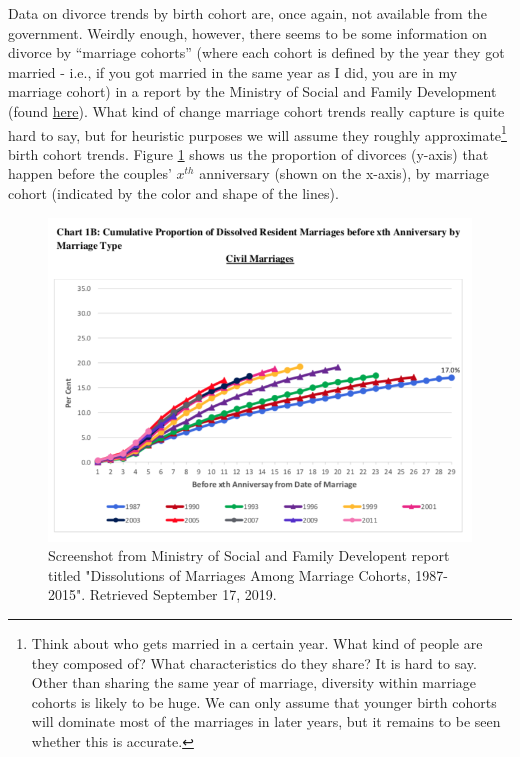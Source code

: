 \documentclass[openany]{book}
\let\rmarkdownfootnote\footnote%
\def\footnote{\protect\rmarkdownfootnote}
\begin{document}
Data on divorce trends by birth cohort are, once again, not available
from the government. Weirdly enough, however, there seems to be some
information on divorce by ``marriage cohorts'' (where each cohort is
defined by the year they got married - i.e., if you got married in the
same year as I did, you are in my marriage cohort) in a report by the
Ministry of Social and Family Development (found
\href{https://www.msf.gov.sg/research-and-data/Research-and-Data-Series/Pages/default.aspx}{here}).
What kind of change marriage cohort trends really capture is quite hard
to say, but for heuristic purposes we will assume they roughly
approximate\footnote{Think about who gets married in a certain year.
  What kind of people are they composed of? What characteristics do they
  share? It is hard to say. Other than sharing the same year of
  marriage, diversity within marriage cohorts is likely to be huge. We
  can only assume that younger birth cohorts will dominate most of the
  marriages in later years, but it remains to be seen whether this is
  accurate.} birth cohort trends. Figure \ref{fig:apc-reportmsf} shows
us the proportion of divorces (y-axis) that happen before the couples'
\(x^{th}\) anniversary (shown on the x-axis), by marriage cohort
(indicated by the color and shape of the lines).

\begin{figure}

{\centering \includegraphics[width=0.8\linewidth]{images/apc/report_fig2} 

}

\caption{Screenshot from Ministry of Social and Family Developent report titled "Dissolutions of Marriages Among Marriage Cohorts, 1987-2015". Retrieved September 17, 2019.}\label{fig:apc-reportmsf}
\end{figure}
\end{document}
